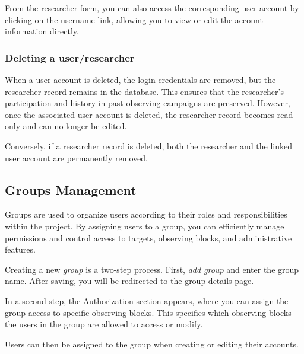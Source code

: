 
From the researcher form, you can also access the corresponding user account by clicking on the username link, allowing you to view or edit the account information directly.


\subsubsection{Deleting a user/researcher}

When a user account is deleted, the login credentials are removed, but the researcher record remains in the database. This ensures that the researcher’s participation and history in past observing campaigns are preserved. However, once the associated user account is deleted, the researcher record becomes read-only and can no longer be edited. 

\warning Conversely, if a researcher record is deleted, both the researcher and the linked user account are permanently removed.


\subsection{Groups Management}

Groups are used to organize users according to their roles and responsibilities within the project. By assigning users to a group, you can efficiently manage permissions and control access to targets, observing blocks, and administrative features.

Creating a new \textsl{group} is a two-step process. First, \textsl{add group} and enter the group name. After saving, you will be redirected to the group details page. 

In a second step, the Authorization section appears, where you can assign the group access to specific observing blocks. This specifies which observing blocks the users in the group are allowed to access or modify.


Users can then be assigned to the group when creating or editing their accounts.




